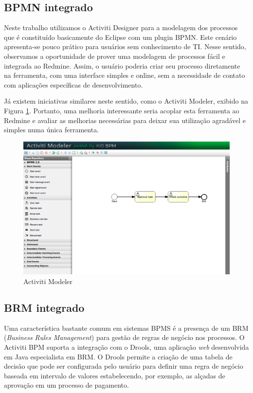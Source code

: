 \subsection{BPMN integrado}

Neste trabalho utilizamos o Activiti Designer para a modelagem dos processos que é constituído basicamente do Eclipse com um plugin BPMN. Este cenário apresenta-se pouco prático para usuários sem conhecimento de TI. Nesse sentido, observamos a oportunidade de prover uma modelagem de processos fácil e integrada ao Redmine. Assim, o usuário poderia criar seu processo diretamente na ferramenta, com uma interface simples e online, sem a necessidade de contato com aplicações específicas de desenvolvimento.

Já existem iniciativas similares neste sentido, como o Activiti Modeler\cite{activiti_modeler}, exibido na Figura \ref{fig:activiti_modeler}. Portanto, uma melhoria interessante seria acoplar esta ferramenta ao Redmine e avaliar as melhorias necessárias para deixar sua utilização agradável e simples numa única ferramenta.

\begin{figure}[H]
\centering
\includegraphics[width=1\textwidth]{imagens/activiti_modeler.png}
\caption{Activiti Modeler}
\label{fig:activiti_modeler}
\end{figure}

\subsection{BRM integrado}

Uma característica bastante comum em sistemas BPMS é a presença de um BRM (\textit{Business Rules Management}) para gestão de regras de negócio nos processos. O Activiti BPM suporta a integração com o Drools, uma aplicação \textit{web} desenvolvida em Java especialista em BRM. O Drools permite a criação de uma tabela de decisão que pode ser configurada pelo usuário para definir uma regra de negócio baseada em intervalo de valores estabelecendo, por exemplo, as alçadas de aprovação em um processo de pagamento.

